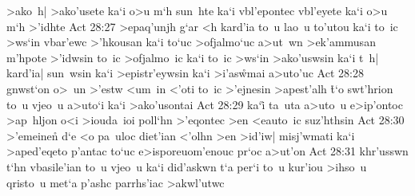 >ako~h|
>ako'usete
ka`i
o>u
m`h
sun~hte
ka`i
vbl'epontec
vbl'eyete
ka`i
o>u
m`h
>'idhte\bibvsend
\vs Act 28:27
>epaq'unjh
g`ar
<h
kard'ia
to~u
lao~u
to'utou
ka`i
to~ic
>ws`in
vbar'ewc
>'hkousan
ka`i
to`uc
>ofjalmo`uc
a>ut~wn
>ek'ammusan
m'hpote
>'idwsin
to~ic
>ofjalmo~ic
ka`i
to~ic
>ws`in
>ako'uswsin
ka`i
t~h|
kard'ia|
sun~wsin
ka`i
>epistr'eywsin
ka`i
>i'as\r{w}mai
a>uto'uc\bibvsend
\vs Act 28:28
gnwst`on
o>~un
>'estw
<um~in
<'oti
to~ic
>'ejnesin
>apest'alh
\r{t}`o
swt'hrion
to~u
vjeo~u
a>uto`i
ka`i
>ako'usontai\bibvsend
\vs Act 28:29
ka`i\r{}
ta~uta
a>uto~u
e>ip'ontoc
>ap~hljon
o<i
>iouda~ioi
poll`hn
>'eqontec
>en
<eauto~ic
suz'hthsin\bibvsend
\vs Act 28:30
>'emeinen\r{}
d`e
<o
pa~uloc
diet'ian
<'olhn
>en
>id'iw|
misj'wmati
ka`i
>aped'eqeto
p'antac
to`uc
e>isporeuom'enouc
pr`oc
a>ut'on\bibvsend
\vs Act 28:31
khr'usswn
t`hn
vbasile'ian
to~u
vjeo~u
ka`i
did'askwn
t`a
per`i
to~u
kur'iou
>ihso~u
qristo~u
met`a
p'ashc
parrhs'iac
>akwl'utwc\bibvsend
